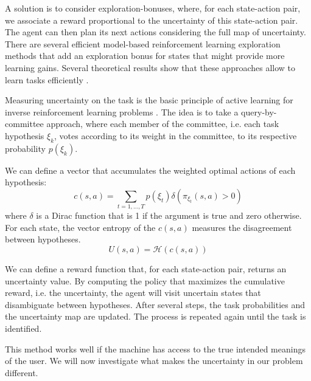A solution is to consider exploration-bonuses, where, for each state-action pair, we associate a reward proportional to the uncertainty of this state-action pair. The agent can then plan its next actions considering the full map of uncertainty. There are several efficient model-based reinforcement learning exploration methods that add an exploration bonus for states that might provide more learning gains. Several theoretical results show that these approaches allow to learn tasks efficiently \cite{brafman2003r,kolter2009near}.


Measuring uncertainty on the task is the basic principle of active learning for inverse reinforcement learning problems \cite{macl09airl}. The idea is to take a query-by-committee approach, where each member of the committee, i.e. each task hypothesis $\xi_k$, votes according to its weight in the committee, to its respective probability $p(\xi_k)$.

We can define a vector that accumulates the weighted optimal actions of each hypothesis: 
%
\[
c(s,a) = \sum_{t = 1, \ldots, T} p(\xi_t) \delta(\pi_{\xi_t}(s,a) > 0)
\]
%
where $\delta$ is a Dirac function that is 1 if the argument is true and zero otherwise. For each state, the vector entropy of the $c(s,a)$ measures the disagreement between hypotheses.
%
\[
U(s,a) = \mathcal{H}(c(s,a))
\]
%

We can define a reward function that, for each state-action pair, returns an uncertainty value. By computing the policy that maximizes the cumulative reward, i.e. the uncertainty, the agent will visit uncertain states that disambiguate between hypotheses. After several steps, the task probabilities and the uncertainty map are updated. The process is repeated again until the task is identified.

This method works well if the machine has access to the true intended meanings of the user. We will now investigate what makes the uncertainty in our problem different.

